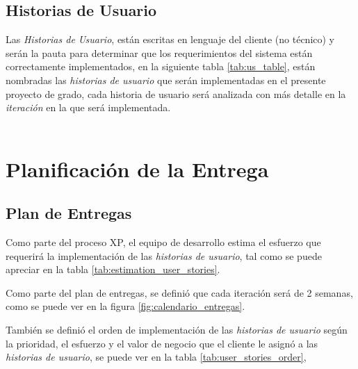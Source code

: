   \subsection{Historias de Usuario}
  \label{sub:historias_de_usuario}

    Las \emph{Historias de Usuario}, están escritas en lenguaje del cliente (no técnico) y serán la pauta para  determinar que los requerimientos del sistema están correctamente implementados, en la siguiente tabla \ref{tab:us_table}, están nombradas las \emph{historias de usuario} que serán implementadas en el presente proyecto de grado, cada historia de usuario será analizada con más detalle en la \emph{iteración} en la que será implementada. \\

    



\\
  \section{Planificación de la Entrega}
  \label{sub:Planificación de la Entrega}


  \subsection{Plan de Entregas}

  Como parte del proceso XP, el equipo de desarrollo estima el esfuerzo que requerirá la implementación de las \emph{historias de usuario}, tal como se puede apreciar en la tabla \ref{tab:estimation_user_stories}.




    Como parte del plan de entregas, se definió que cada iteración será de 2 semanas, como se puede ver en la figura \ref{fig:calendario_entregas}.




       También se definió el orden de implementación de las  \emph{historias de usuario} según la  prioridad, el esfuerzo y el valor de negocio que el cliente le asignó a las \emph{historias de usuario}, se puede ver en la tabla \ref{tab:user_stories_order},

